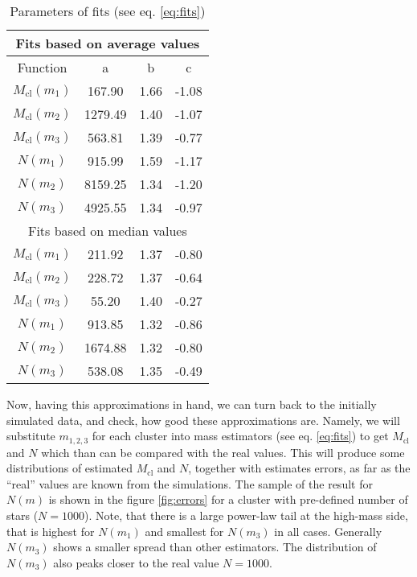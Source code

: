 \documentclass[a4paper,10pt]{article}
\newcommand{\Mcl}{M_{\mathrm{cl}}}
\begin{document}
\begin{table} 
\begin{center}
\caption{Parameters of fits (see eq. \ref{eq:fits})}\label{tbl:fits}
\begin{tabular}{cccc} \\ \toprule
\multicolumn{4}{c}{Fits based on average values} \\ \midrule
Function & a & b & c \\ \midrule
$\Mcl(m_1)$ &  167.90 & 1.66 & -1.08 \\ \midrule
$\Mcl(m_2)$ & 1279.49 & 1.40 & -1.07 \\ \midrule
$\Mcl(m_3)$ &  563.81 & 1.39 & -0.77 \\ \midrule
$N(m_1)$    &  915.99 & 1.59 & -1.17 \\ \midrule
$N(m_2)$    & 8159.25 & 1.34 & -1.20 \\ \midrule
$N(m_3)$    & 4925.55 & 1.34 & -0.97 \\ \midrule
\multicolumn{4}{c}{Fits based on median values} \\ \midrule
$\Mcl(m_1)$ &   211.92 & 1.37 & -0.80 \\ \midrule
$\Mcl(m_2)$ &   228.72 & 1.37 & -0.64 \\ \midrule
$\Mcl(m_3)$ &    55.20 & 1.40 & -0.27 \\ \midrule
$N(m_1)$    &   913.85 & 1.32 & -0.86 \\ \midrule
$N(m_2)$    &  1674.88 & 1.32 & -0.80 \\ \midrule
$N(m_3)$    &   538.08 & 1.35 & -0.49 \\ \bottomrule
\end{tabular}
\end{center}
\end{table}

Now, having this approximations in hand, we can turn back to the initially simulated data, and check, how good these approximations are. Namely, we will substitute $m_{1,2,3}$ for each cluster into mass estimators (see eq. \ref{eq:fits}) to get $\Mcl$ and $N$ which than can be compared with the real values. This will produce some distributions of estimated $\Mcl$ and $N$, together with estimates errors, as far as the ``real'' values are known from the simulations. The sample of the result for $N(m)$ is shown in the figure \ref{fig:errors} for a cluster with pre-defined number of stars ($N=1000$).
Note, that there is a large power-law tail at the high-mass side, that is highest for $N(m_1)$ and smallest for $N(m_3)$ in all cases. Generally $N(m_3)$ shows a smaller spread than other estimators. The distribution of $N(m_3)$ also peaks closer to the real value $N=1000$. 
\end{document}
